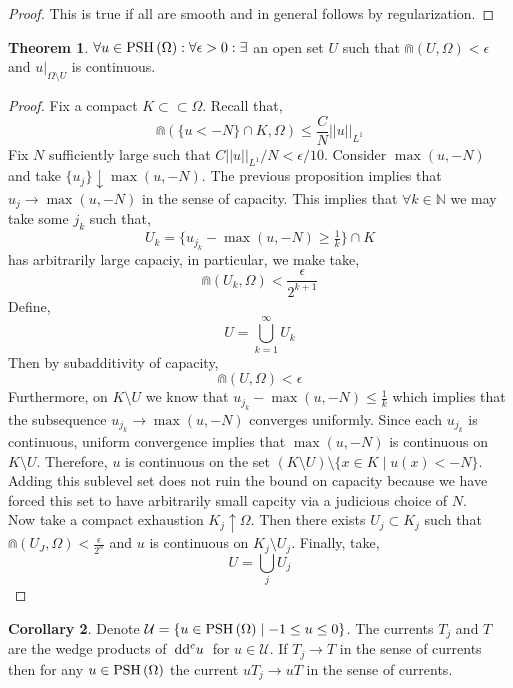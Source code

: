 \documentclass[12pt]{extarticle}
\newcommand{\N}{\mathbb{N}}
\theoremstyle{definition}
\newtheorem{theorem}{Theorem}[section]
\newtheorem{corollary}[theorem]{Corollary}
\begin{document}
\begin{proof}
This is true if all are smooth and in general follows by regularization. 
\end{proof}

\begin{theorem}
$\forall u \in \mathrm{PSH}\left( \Omega \right) : \forall \epsilon > 0 : \exists$ an open set $U$ such that $\Cap(U, \Omega) < \epsilon$ and $u|_{\Omega \setminus U}$ is continuous. 
\end{theorem}

\begin{proof}
Fix a compact $K \subset \subset \Omega$. Recall that,
\[ \Cap(\{ u < - N \} \cap K, \Omega) \le \frac{C}{N} || u ||_{L^1} \]
Fix $N$ sufficiently large such that $C || u ||_{L^1} / N < \epsilon / 10$. Consider $\max(u, -N)$ and take $\{ u_j \} \downarrow \max(u, - N)$. The previous proposition implies that $u_j \to \max(u, - N)$ in the sense of capacity. This implies that $\forall k \in \N$ we may take some $j_k$ such that,
\[ U_k = \{ u_{j_k} - \max(u, - N) \ge \tfrac{1}{k} \} \cap K \]
has arbitrarily large capaciy, in particular, we make take,
\[ \Cap(U_k, \Omega) < \frac{\epsilon}{2^{k+1}} \]
Define,
\[ U = \bigcup_{k = 1}^\infty U_k \] 
Then by subadditivity of capacity,
\[ \Cap(U, \Omega) < \epsilon \]
Furthermore, on $K \setminus U$ we know that $u_{j_k} - \max(u, -N) \le \frac{1}{k}$ which implies that the subsequence $u_{j_k} \to \max(u, -N)$ converges uniformly. Since each $u_{j_k}$ is continuous, uniform convergence implies that $\max(u, -N)$ is continuous on $K \setminus U$. Therefore, $u$ is continuous on the set $(K \setminus U) \setminus \{ x \in K \mid u(x) < - N \}$. Adding this sublevel set does not ruin the bound on capacity because we have forced this set to have arbitrarily small capcity via a judicious choice of $N$.
\bigskip\\
Now take a compact exhaustion $K_j \uparrow \Omega$. Then there exists $U_j \subset K_j$ such that $\Cap(U_J, \Omega) < \frac{\epsilon}{2^n}$ and $u$ is continuous on $K_j \setminus U_j$. Finally, take,
\[ U = \bigcup_{j} U_j \]
\end{proof}

\newcommand{\U}{\mathcal{U}}

\begin{corollary}
Denote $\U = \{ u \in \PSH{\Omega} \mid -1 \le u \le 0 \}$. The currents $T_j$ and $T$ are the wedge products of $\: \mathrm{d}\mathrm{d}^c{u} \:$ for $u \in \U$. If $T_j \to T$ in the sense of currents then for any $u \in \mathrm{PSH}\left( \Omega \right)$ the current $u T_j \to u T$ in the sense of currents. 
\end{corollary}
\end{document}
